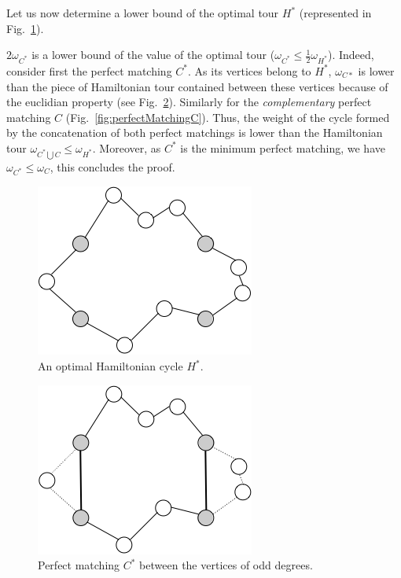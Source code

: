 Let us now determine a lower bound of the optimal tour $H^*$ (represented in Fig.~\ref{fig:perfectMatchingInitial}).

$2 \omega_{C^*}$ is a lower bound of the value of the optimal tour ($\omega_{C^*} \leq \frac{1}{2} \omega_{H^*}$). 
Indeed, consider first the perfect matching $C^*$.
As its vertices belong to $H^*$, $\omega_{C*}$ is lower than the piece of Hamiltonian tour contained between these vertices
because of the euclidian property (see Fig.~\ref{fig:perfectMatchingC*}).
Similarly for the \textit{complementary} perfect matching $C$ (Fig.~\ref{fig:perfectMatchingC}).  
Thus, the weight of the cycle formed by the concatenation of both perfect matchings 
is lower than the Hamiltonian tour $\omega_{C^* \bigcup C} \leq \omega_{H^*}$.
Moreover, as $C^*$ is the minimum perfect matching, we have $\omega_{C^*} \leq \omega_{C}$, 
this concludes the proof.


\begin{figure}[hbt]
\begin{center}
       \includegraphics[scale=0.7]{FiguresGraph/perfectmatching1}
       \caption{An optimal Hamiltonian cycle $H^*$.}
              \label{fig:perfectMatchingInitial}
\end{center}
\end{figure}

\begin{figure}[hbt]
\begin{center}
       \includegraphics[scale=0.7]{FiguresGraph/perfectmatching2}
       \caption{Perfect matching $C^*$ between the vertices of odd degrees.}
              \label{fig:perfectMatchingC*}
\end{center}
\end{figure}

